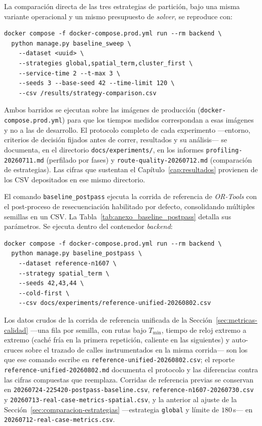 La comparación directa de las tres estrategias de partición, bajo una misma
variante operacional y un mismo presupuesto de \textit{solver}, se reproduce con:

\begin{verbatim}
docker compose -f docker-compose.prod.yml run --rm backend \
  python manage.py baseline_sweep \
    --dataset <uuid> \
    --strategies global,spatial_term,cluster_first \
    --service-time 2 --t-max 3 \
    --seeds 3 --base-seed 42 --time-limit 120 \
    --csv /results/strategy-comparison.csv
\end{verbatim}

\begin{sloppypar}
Ambos barridos se ejecutan sobre las imágenes de producción
(\texttt{docker-compose.prod.yml}) para que los tiempos medidos correspondan a esas
imágenes y no a las de desarrollo. El protocolo completo de cada experimento
---entorno, criterios de decisión fijados antes de correr, resultados y su análisis---
se documenta, en el directorio \texttt{docs\slash experiments\slash }, en los informes
\texttt{profiling-20260711.md} (perfilado por fases) y
\texttt{route-quality-20260712.md} (comparación de estrategias). Las cifras que
sustentan el Capítulo~\ref{cap:resultados} provienen de los CSV depositados en ese
mismo directorio.
\end{sloppypar}

El comando \texttt{baseline\_postpass} ejecuta la corrida de referencia de
\textit{OR-Tools} con el post-proceso de resecuenciación habilitado por defecto,
consolidando múltiples semillas en un CSV. La
Tabla~\ref{tab:anexo_baseline_postpass} detalla sus parámetros. Se ejecuta dentro
del contenedor \textit{backend}:

\begin{verbatim}
docker compose -f docker-compose.prod.yml run --rm backend \
  python manage.py baseline_postpass \
    --dataset reference-n1607 \
    --strategy spatial_term \
    --seeds 42,43,44 \
    --cold-first \
    --csv docs/experiments/reference-unified-20260802.csv
\end{verbatim}

\begin{sloppypar}
Los datos crudos de la corrida de referencia unificada de la
Sección~\ref{sec:metricas-calidad} ---una fila por semilla, con rutas bajo $T_{\min}$, tiempo de
reloj extremo a extremo (caché fría en la primera repetición, caliente en las siguientes) y
auto-cruces sobre el trazado de calles instrumentados en la misma corrida--- son los que ese
comando escribe en \texttt{reference-unified-20260802.csv}; el reporte
\texttt{reference-unified-20260802.md} documenta el protocolo y las diferencias contra las cifras
compuestas que reemplaza. Corridas de referencia previas se conservan en
\texttt{20260724-225420-postpass-baseline.csv}, \texttt{reference-n1607-20260730.csv} y
\texttt{20260713-real-case-metrics-spatial.csv}, y la anterior al ajuste de la
Sección~\ref{sec:comparacion-estrategias} ---estrategia \texttt{global} y límite de $180$\,s--- en
\texttt{20260712-real-case-metrics.csv}.
\end{sloppypar}

